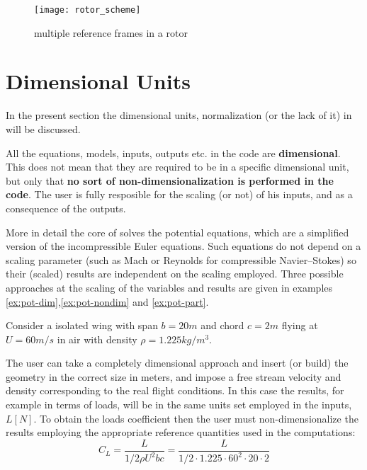 \begin{figure}
\centering
\texttt{[image: rotor\_scheme]}
\caption{multiple reference frames in a rotor}
\label{fig:multiple_refs}
\end{figure}

\section{Dimensional Units}
\label{sec:Dimensional_Units}

In the present section the dimensional units, normalization (or the lack of it) in \DUST{} will be discussed.

All the equations, models, inputs, outputs etc. in the code are \textbf{dimensional}. This does not mean that they are required to be in a specific dimensional unit, but only that \textbf{no sort of non-dimensionalization is performed in the code}. The user is fully resposible for the scaling (or not) of his inputs, and as a consequence of the outputs. 

More in detail the core of \DUST{} solves the potential equations, which are a simplified version of the incompressible Euler equations. Such equations do not depend on a scaling parameter (such as Mach or Reynolds for compressible Navier--Stokes) so their (scaled) results are independent on the scaling employed. Three possible approaches at the scaling of the variables and results are given in examples \ref{ex:pot-dim},\ref{ex:pot-nondim} and \ref{ex:pot-part}. 

\begin{example}
\label{ex:pot-dim}
Consider a isolated wing with span $b = 20 m$ and chord $c = 2 m$ flying at $U = 60 m/s$ in air with density $\rho = 1.225 kg/m^3$. 

The user can take a completely dimensional approach and insert (or build) the geometry in the correct size in meters, and impose a free stream velocity and density corresponding to the real flight conditions. In this case the results, for example in terms of loads, will be in the same units set employed in the inputs, $L [N]$. To obtain the loads coefficient then the user must non-dimensionalize the results employing the appropriate reference quantities used in the computations:
\begin{equation*}
    C_L = \frac{L}{1/2 \rho U^2 b c} = \frac{L}{1/2 \cdot 1.225  \cdot 60^2 \cdot 20 \cdot 2}
\end{equation*}
\end{example}

